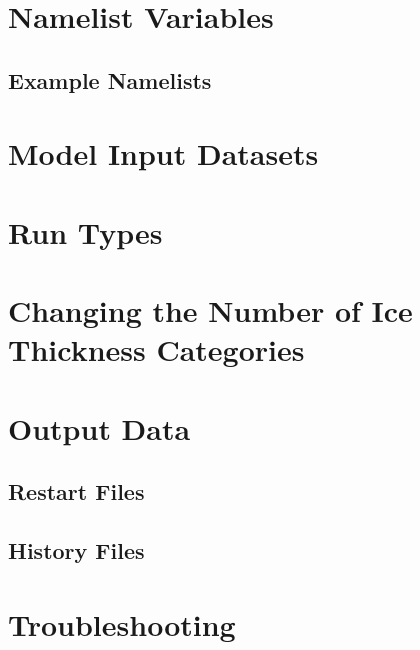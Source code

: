 \documentclass[]{article}
\begin{document}
    

\section{Namelist Variables}
  \label{namelist}
  
    \subsection{Example Namelists}
    

\section{Model Input Datasets}
  

\section{Run Types}
  \label{runtypes}
  

\section{Changing the Number of Ice Thickness Categories}
  \label{ncat}
  

\section{Output Data}
  
    \subsection{Restart Files}
      \label{restart_files}
      
    \subsection{History Files}
      \label{history_files}
      \label{history}
      

\section{Troubleshooting}
  

\newpage
 
\end{document}
